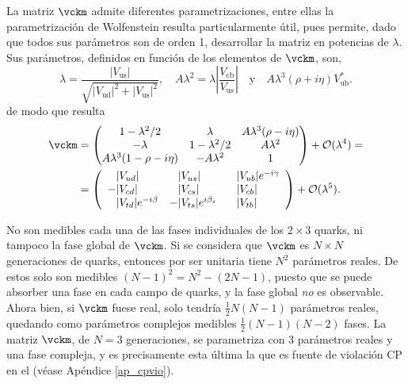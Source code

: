 \color{vero}
La matriz $\vckm$ admite diferentes parametrizaciones, entre ellas la parametrización de Wolfenstein resulta particularmente útil, pues permite, dado que todos sus parámetros son de orden 1, desarrollar la matriz en potencias de $\lambda$. Sus parámetros, definidos en función de los elementos de $\vckm$, son,
\[ \lambda = \frac{|V_{\text{us}}|}{\sqrt{|V_{\text{ud}}|^2+|V_{\text{us}}|^2}}, \quad A \lambda^2 = \lambda \left|\frac{V_{\text{cb}}}{V_{\text{us}}}\right|\quad \text{y} \quad A \lambda^3 (\rho + i \eta ) V_{\text{ub}}^* . \] \color{norm}
de modo que resulta
\begin{equation}
\begin{split}
\vckm   & = \begin{pmatrix} 1-\lambda^2/2 & \lambda & A\lambda^3(\rho-i\eta) \\
 -\lambda & 1-\lambda^2/2 & A\lambda^2 \\
 A\lambda^3(1-\rho-i\eta) & -A\lambda^2 & 1  \end{pmatrix} + \mathcal{O}(\lambda ^4 )= \\ & =
 \left(\begin{array}{lll}
	\phantom{-} |V_{ud}| & \phantom{-}|V_{us}| & \phantom{-}|V_{ub}|e^{-i\gamma} \\
	-|V_{cd}| & \phantom{-}|V_{cs}| & \phantom{-}|V_{cb}| \\
	  \phantom{-}|V_{td}|e^{-i\beta} &-|V_{ts}|e^{i\beta_s} & \phantom{-}|V_{tb}| \\
\end{array}\right) + \mathcal{O}(\lambda ^5 ).
\end{split}	
\end{equation}
\color{vero}


%

No son medibles cada una de las fases individuales de los $2\times3$ quarks, ni tampoco la fase global de $\vckm$. Si se considera que $\vckm$ es $N \times N$ generaciones de quarks, entonces por ser unitaria tiene $N^2$ parámetros reales. 
De estos solo son medibles $(N-1)^2 = N^2 - (2N-1)$, puesto que se puede absorber una fase en cada campo de quarks, y la fase global \textit{no} es observable. Ahora bien, si $\vckm$ fuese real, solo tendría $\frac{1}{2} N(N -1)$ parámetros reales, quedando como parámetros complejos medibles $\frac{1}{2}(N-1)(N-2)$ fases. \color{norm}
%
La matriz $\vckm$, de $N=3$ generaciones, se parametriza con 3 parámetros reales y una fase compleja, y es precisamente esta última la que es fuente de violación CP en el \stdmod (véase Apéndice \ref{ap_cpvio}).

